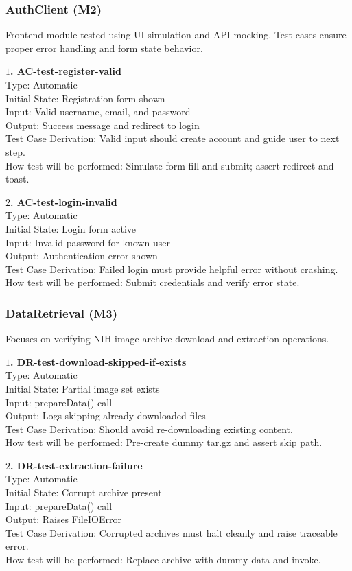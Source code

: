 \documentclass[12pt, titlepage]{article}
\begin{document}
\subsubsection{AuthClient (M2)}
Frontend module tested using UI simulation and API mocking. Test cases ensure proper error handling and form state behavior.

\textbf{$1$. AC-test-register-valid}\\
Type: Automatic\\
Initial State: Registration form shown\\
Input: Valid username, email, and password\\
Output: Success message and redirect to login\\
Test Case Derivation: Valid input should create account and guide user to next step.\\
How test will be performed: Simulate form fill and submit; assert redirect and toast.

\textbf{$2$. AC-test-login-invalid}\\
Type: Automatic\\
Initial State: Login form active\\
Input: Invalid password for known user\\
Output: Authentication error shown\\
Test Case Derivation: Failed login must provide helpful error without crashing.\\
How test will be performed: Submit credentials and verify error state.

\subsubsection{DataRetrieval (M3)}
Focuses on verifying NIH image archive download and extraction operations.

\textbf{$1$. DR-test-download-skipped-if-exists}\\
Type: Automatic\\
Initial State: Partial image set exists\\
Input: prepareData() call\\
Output: Logs skipping already-downloaded files\\
Test Case Derivation: Should avoid re-downloading existing content.\\
How test will be performed: Pre-create dummy tar.gz and assert skip path.

\textbf{$2$. DR-test-extraction-failure}\\
Type: Automatic\\
Initial State: Corrupt archive present\\
Input: prepareData() call\\
Output: Raises FileIOError\\
Test Case Derivation: Corrupted archives must halt cleanly and raise traceable error.\\
How test will be performed: Replace archive with dummy data and invoke.
\end{document}
